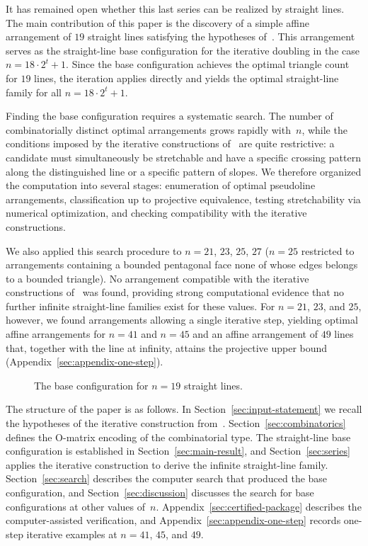 It has remained open whether this last series can be realized by straight lines.
The main contribution of this paper is the discovery of a simple affine
arrangement of $19$ straight lines satisfying the
hypotheses of~\cite[Proposition~3.1]{bartholdi2007}. This arrangement serves as
the straight-line base configuration for the iterative doubling in the case
$n=18\cdot 2^t+1$. Since the base configuration achieves the optimal triangle
count for $19$ lines, the iteration applies directly and yields the optimal
straight-line family for all $n=18\cdot 2^t+1$.

Finding the base configuration requires a systematic search. The number of
combinatorially distinct optimal arrangements grows rapidly with~$n$, while the
conditions imposed by the iterative constructions
of~\cite{forge1998,bartholdi2007} are quite restrictive: a candidate
must simultaneously be stretchable and have a specific crossing pattern
along the distinguished line or a specific pattern of slopes. We therefore organized the
computation into several stages: enumeration of optimal pseudoline arrangements,
classification up to projective equivalence, testing stretchability via
numerical optimization, and checking compatibility with the iterative constructions.

We also applied this search procedure to $n=21$, $23$, $25$, $27$ ($n=25$ restricted to
arrangements containing a bounded pentagonal face none of whose edges belongs
to a bounded triangle). No arrangement compatible with the iterative constructions
of~\cite{forge1998,bartholdi2007} was found, providing strong computational evidence
that no further infinite straight-line families exist for
these values. For $n=21$, $23$, and $25$,
however, we found arrangements allowing a single iterative step,
yielding optimal affine arrangements for $n=41$ and $n=45$
and an affine arrangement of $49$ lines that, together with the line at infinity,
attains the projective upper bound (Appendix~\ref{sec:appendix-one-step}).

\begin{figure}[!ht]
\centering

\caption{The base configuration for $n=19$ straight lines.
}
\label{fig:base-configuration}
\end{figure}

The structure of the paper is as follows. In
Section~\ref{sec:input-statement} we recall the hypotheses of the iterative
construction from~\cite{bartholdi2007}. Section~\ref{sec:combinatorics} defines
the $\mathrm{O}$-matrix encoding of the combinatorial type.
The straight-line base configuration is
established in Section~\ref{sec:main-result}, and
Section~\ref{sec:series} applies the iterative construction to derive the
infinite straight-line family. Section~\ref{sec:search} describes the computer
search that produced the base configuration, and
Section~\ref{sec:discussion} discusses the search for base
configurations at other values of~$n$.
Appendix~\ref{sec:certified-package} describes the computer-assisted
verification, and Appendix~\ref{sec:appendix-one-step} records one-step
iterative examples at $n=41$, $45$, and $49$.
